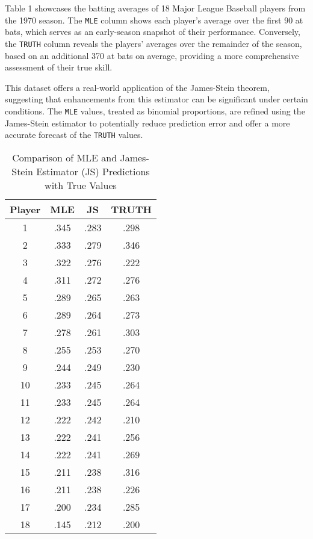 Table 1 showcases the batting averages of 18 Major League Baseball players from the 1970 season. The \texttt{MLE} column shows each player's average over the first 90 at bats, which serves as an early-season snapshot of their performance. Conversely, the \texttt{TRUTH} column reveals the players' averages over the remainder of the season, based on an additional 370 at bats on average, providing a more comprehensive assessment of their true skill.

This dataset offers a real-world application of the James-Stein theorem, suggesting that enhancements from this estimator can be significant under certain conditions. The \texttt{MLE} values, treated as binomial proportions, are refined using the James-Stein estimator to potentially reduce prediction error and offer a more accurate forecast of the \texttt{TRUTH} values.

\newpage

\begin{table}[h]
\centering
\begin{tabular}{cccc}
\hline
Player & MLE & JS & TRUTH \\
\hline
1 & .345 & .283 & .298 \\
2 & .333 & .279 & .346 \\
3 & .322 & .276 & .222 \\
4 & .311 & .272 & .276 \\
5 & .289 & .265 & .263 \\
6 & .289 & .264 & .273 \\
7 & .278 & .261 & .303 \\
8 & .255 & .253 & .270 \\
9 & .244 & .249 & .230 \\
10 & .233 & .245 & .264 \\
11 & .233 & .245 & .264 \\
12 & .222 & .242 & .210 \\
13 & .222 & .241 & .256 \\
14 & .222 & .241 & .269 \\
15 & .211 & .238 & .316 \\
16 & .211 & .238 & .226 \\
17 & .200 & .234 & .285 \\
18 & .145 & .212 & .200 \\
\hline
\end{tabular}
\caption{Comparison of MLE and James-Stein Estimator (JS) Predictions with True Values}
\end{table}

